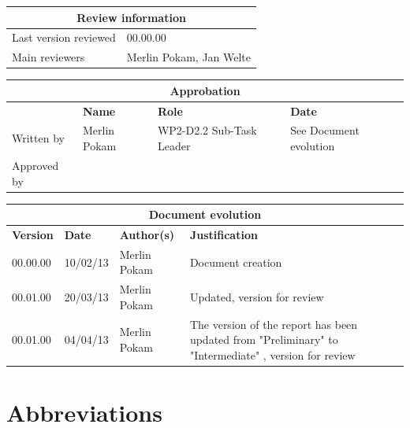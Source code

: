 \documentclass{template/openetcs_report}
\begin{document}
\begin{tabular}{|p{4.4cm}|p{8.7cm}|}
\hline
\multicolumn{2}{|c|}{\textbf{Review information}} \\
\hline
Last version reviewed & 00.00.00 \\
\hline
Main reviewers & Merlin Pokam, Jan Welte \\
\hline
\end{tabular}

\begin{tabular}{|p{2.2cm}|p{4cm}|p{4cm}|p{2cm}|}
\hline
\multicolumn{4}{|c|}{\textbf{Approbation}} \\
\hline
  &  \textbf{Name} & \textbf{Role} & \textbf{Date}   \\
\hline  
Written by    &  Merlin Pokam & WP2-D2.2 Sub-Task Leader  & See Document evolution\\
\hline
Approved by &  &  & \\
\hline
\end{tabular}

\begin{tabular}{|p{2.2cm}|p{2cm}|p{3cm}|p{5cm}|}
\hline
\multicolumn{4}{|c|}{\textbf{Document evolution}} \\
\hline
\textbf{Version} &  \textbf{Date} & \textbf{Author(s)} & \textbf{Justification}  \\
\hline  
00.00.00 & 10/02/13 & Merlin Pokam &  Document creation  \\
\hline  
00.01.00 & 20/03/13 & Merlin Pokam &  Updated, version for review  \\
\hline
00.01.00 & 04/04/13 & Merlin Pokam &  The version of the report has been updated from "Preliminary" to "Intermediate" , version for review  \\
\hline
\end{tabular}



\tableofcontents
\listoffiguresandtables




\chapter{Abbreviations}
\end{document}
